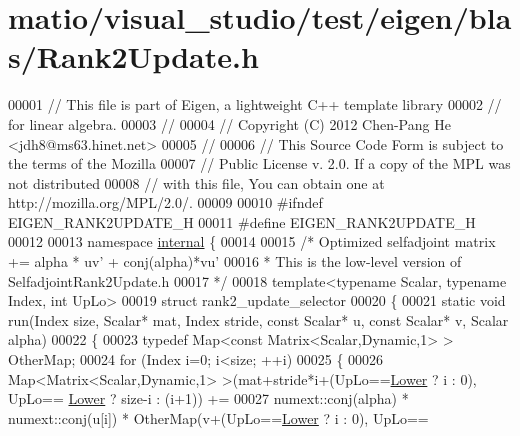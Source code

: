 \hypertarget{matio_2visual__studio_2test_2eigen_2blas_2_rank2_update_8h_source}{}\section{matio/visual\+\_\+studio/test/eigen/blas/\+Rank2\+Update.h}
\label{matio_2visual__studio_2test_2eigen_2blas_2_rank2_update_8h_source}

\begin{DoxyCode}
00001 \textcolor{comment}{// This file is part of Eigen, a lightweight C++ template library}
00002 \textcolor{comment}{// for linear algebra.}
00003 \textcolor{comment}{//}
00004 \textcolor{comment}{// Copyright (C) 2012 Chen-Pang He <jdh8@ms63.hinet.net>}
00005 \textcolor{comment}{//}
00006 \textcolor{comment}{// This Source Code Form is subject to the terms of the Mozilla}
00007 \textcolor{comment}{// Public License v. 2.0. If a copy of the MPL was not distributed}
00008 \textcolor{comment}{// with this file, You can obtain one at http://mozilla.org/MPL/2.0/.}
00009 
00010 \textcolor{preprocessor}{#ifndef EIGEN\_RANK2UPDATE\_H}
00011 \textcolor{preprocessor}{#define EIGEN\_RANK2UPDATE\_H}
00012 
00013 \textcolor{keyword}{namespace }\hyperlink{namespaceinternal}{internal} \{
00014 
00015 \textcolor{comment}{/* Optimized selfadjoint matrix += alpha * uv' + conj(alpha)*vu'}
00016 \textcolor{comment}{ * This is the low-level version of SelfadjointRank2Update.h}
00017 \textcolor{comment}{ */}
00018 \textcolor{keyword}{template}<\textcolor{keyword}{typename} Scalar, \textcolor{keyword}{typename} Index, \textcolor{keywordtype}{int} UpLo>
00019 \textcolor{keyword}{struct }rank2\_update\_selector
00020 \{
00021   \textcolor{keyword}{static} \textcolor{keywordtype}{void} run(Index size, Scalar* mat, Index stride, \textcolor{keyword}{const} Scalar* u, \textcolor{keyword}{const} Scalar* v, Scalar alpha)
00022   \{
00023     \textcolor{keyword}{typedef} Map<const Matrix<Scalar,Dynamic,1> > OtherMap;
00024     \textcolor{keywordflow}{for} (Index i=0; i<size; ++i)
00025     \{
00026       Map<Matrix<Scalar,Dynamic,1> >(mat+stride*i+(UpLo==\hyperlink{group__enums_gga39e3366ff5554d731e7dc8bb642f83cda891792b8ed394f7607ab16dd716f60e6}{Lower} ? i : 0), UpLo==
      \hyperlink{group__enums_gga39e3366ff5554d731e7dc8bb642f83cda891792b8ed394f7607ab16dd716f60e6}{Lower} ? size-i : (i+1)) +=
00027       numext::conj(alpha) * numext::conj(u[i]) * OtherMap(v+(UpLo==\hyperlink{group__enums_gga39e3366ff5554d731e7dc8bb642f83cda891792b8ed394f7607ab16dd716f60e6}{Lower} ? i : 0), UpLo==

\end{DoxyCode}
